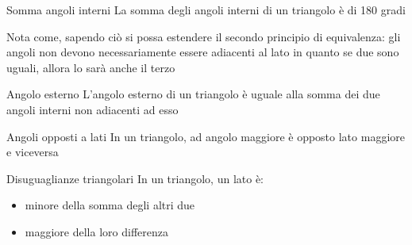 \begin{teorema}{Somma angoli interni}
	La somma degli angoli interni di un triangolo è di 180 gradi
\end{teorema}
Nota come, sapendo ciò si possa estendere il secondo principio di equivalenza: gli angoli non devono necessariamente essere adiacenti al lato in quanto se due sono uguali, allora lo sarà anche il terzo
\begin{teorema}{Angolo esterno}
	L'angolo esterno di un triangolo è uguale alla somma dei due angoli interni non adiacenti ad esso
\end{teorema}
\begin{teorema}{Angoli opposti a lati}
	In un triangolo, ad angolo maggiore è opposto lato maggiore e viceversa
\end{teorema}
\begin{teorema}{Disuguaglianze triangolari}
	In un triangolo, un lato è:
	\begin{itemize}
		\item minore della somma degli altri due
		\item maggiore della loro differenza
	\end{itemize}
\end{teorema}

